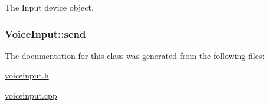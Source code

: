 \-The \-Input device object. 

\hypertarget{class_voice_input_a40ab6705a21bcbaae15e9a673f6eee53}{
\subsubsection[{send}]{ {\bf \-Voice\-Input\-::send}}}
\label{class_voice_input_a40ab6705a21bcbaae15e9a673f6eee53}


\-The documentation for this class was generated from the following files\-:\begin{DoxyCompactItemize}
\item 
\hyperlink{voiceinput_8h}{voiceinput.\-h}\item 
\hyperlink{voiceinput_8cpp}{voiceinput.\-cpp}\end{DoxyCompactItemize}
